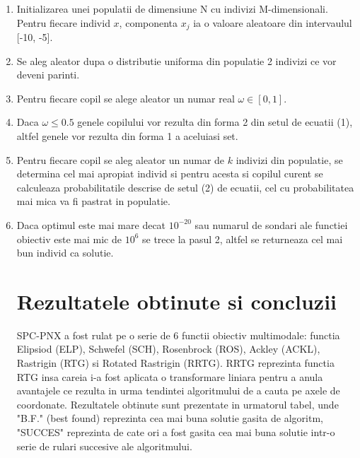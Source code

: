 \documentclass[a4paper]{article}
\begin{document}
\begin{enumerate}

\item Initializarea unei populatii de dimensiune N cu indivizi M-dimensionali. Pentru fiecare individ $x$, componenta $x_j$ ia o valoare aleatoare din intervaulul [-10, -5].

\item Se aleg aleator dupa o distributie uniforma din populatie 2 indivizi ce vor deveni parinti.

\item Pentru fiecare copil se alege aleator un numar real $\omega \in [0,1]$.

\item Daca $\omega \leq 0.5$ genele copilului vor rezulta din forma 2 din setul de ecuatii (1), altfel genele vor rezulta din forma 1 a aceluiasi set.

\item Pentru fiecare copil se aleg aleator un numar de $k$ indivizi din populatie, se determina cel mai apropiat individ si pentru acesta si copilul curent se calculeaza probabilitatile descrise de setul (2) de ecuatii, cel cu probabilitatea mai mica va fi pastrat in populatie.

\item Daca optimul este mai mare decat $10^{-20}$ sau numarul de sondari ale functiei obiectiv este mai mic de $10^6$ se trece la pasul 2, altfel se returneaza cel mai bun individ ca solutie.

\newpage

\section{Rezultatele obtinute si concluzii}

\Large
SPC-PNX a fost rulat pe o serie de 6 functii obiectiv multimodale: functia Elipsiod (ELP), Schwefel (SCH), Rosenbrock (ROS), Ackley (ACKL), Rastrigin (RTG) si Rotated Rastrigin (RRTG). RRTG reprezinta functia RTG insa careia i-a fost aplicata o transformare liniara pentru a anula avantajele ce rezulta in urma tendintei algoritmului de a cauta pe axele de coordonate. Rezultatele obtinute sunt prezentate in urmatorul tabel, unde "B.F." (best found) reprezinta cea mai buna solutie gasita de algoritm, "SUCCES" reprezinta de cate ori a fost gasita cea mai buna solutie intr-o serie de rulari succesive ale algoritmului. \\



\end{enumerate}
\end{document}
